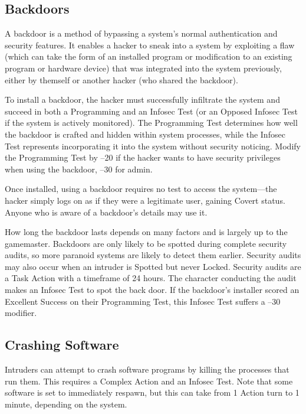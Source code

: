 \subsection{Backdoors}

A backdoor is a method of bypassing a system's normal 
authentication and security features. It enables a hacker 
to sneak into a system by exploiting a flaw (which can 
take the form of an installed program or modification 
to an existing program or hardware device) that was 
integrated into the system previously, either by themself 
or another hacker (who shared the backdoor).

To install a backdoor, the hacker must successfully 
infiltrate the system and succeed in both a Programming
and an Infosec Test (or an Opposed Infosec Test
if the system is actively monitored). The Programming 
Test determines how well the backdoor is crafted and 
hidden within system processes, while the Infosec Test 
represents incorporating it into the system without security
noticing. Modify the Programming Test by –20
if the hacker wants to have security privileges when 
using the backdoor, –30 for admin.

Once installed, using a backdoor requires no test to 
access the system—the hacker simply logs on as if they 
were a legitimate user, gaining Covert status. Anyone 
who is aware of a backdoor's details may use it.

How long the backdoor lasts depends on many factors
and is largely up to the gamemaster. Backdoors
are only likely to be spotted during complete security 
audits, so more paranoid systems are likely to detect 
them earlier. Security audits may also occur when an 
intruder is Spotted but never Locked. Security audits 
are a Task Action with a timeframe of 24 hours. The 
character conducting the audit makes an Infosec 
Test to spot the back door. If the backdoor's installer 
scored an Excellent Success on their Programming 
Test, this Infosec Test suffers a –30 modifier.

\subsection{Crashing Software}

Intruders can attempt to crash software programs 
by killing the processes that run them. This requires a 
Complex Action and an Infosec Test. Note that some 
software is set to immediately respawn, but this can take 
from 1 Action turn to 1 minute, depending on the system.

